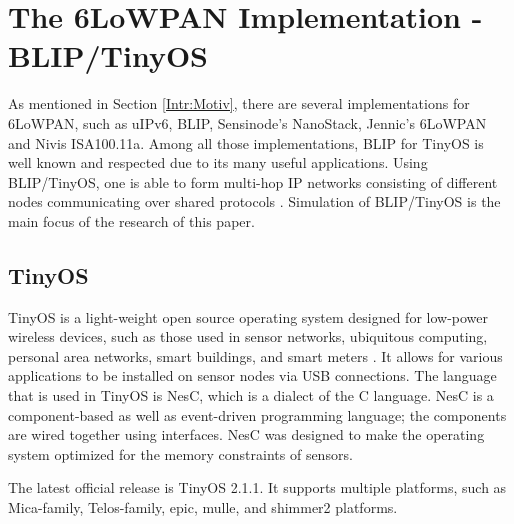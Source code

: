 \chapter{The 6LoWPAN Implementation - BLIP/TinyOS}
\label{Blip/TinyOS}
As mentioned in Section \ref{Intr:Motiv}, there are several implementations for 6LoWPAN, such as uIPv6, BLIP, Sensinode's NanoStack, Jennic's 6LoWPAN and Nivis ISA100.11a. Among all those implementations, BLIP for TinyOS is well known and respected due to its many useful applications. Using BLIP/TinyOS, one is able to form multi-hop IP networks consisting of different nodes communicating over shared protocols \cite{BLIP}. Simulation of BLIP/TinyOS is the main focus of the research of this paper.

\section{TinyOS}
\label{TinyOS}
TinyOS is a light-weight open source operating system designed for low-power wireless devices, such as those used in sensor networks, ubiquitous computing, personal area networks, smart buildings, and smart meters \cite{TinyOS}. It allows for various applications to be installed on sensor nodes via USB connections. The language that is used in TinyOS is NesC, which is a dialect of the C language. NesC is a component-based as well as event-driven programming language; the components are wired together using interfaces. NesC was designed to make the operating system optimized for the memory constraints of sensors.

The latest official release is TinyOS 2.1.1. It supports multiple platforms, such as Mica-family, Telos-family, epic, mulle, and shimmer2 platforms.

